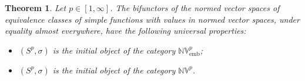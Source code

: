 \documentclass{amsart}
\theoremstyle{definition}
\theoremstyle{plain}
\newtheorem{theorem}[definition]{Theorem}
\newcommand{\NVembp}{\mathbb{NV}_{\mathrm{emb}}^p}
\newcommand{\NVp}{\mathbb{NV}^p}
\begin{document}
        \begin{theorem} 
        \label{thm:universal properties of simple functions with values in normed vector spaces}
            Let $p \in [1,\infty]$. 
            The bifunctors of the normed vector spaces of equivalence classes of simple functions with values in normed vector spaces, under equality almost everywhere, have the following universal properties:
            \begin{itemize}
                \item[(i)] $(S^p,\sigma)$ is the initial object of the category $\NVembp$;
                \item[(ii)] $(S^p,\sigma)$ is the initial object of the category $\NVp$.
            \end{itemize}
        \end{theorem}
\end{document}
